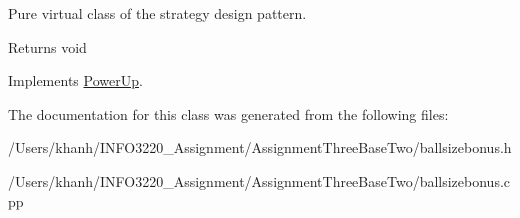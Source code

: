 Pure virtual class of the strategy design pattern. 

\begin{DoxyReturn}{Returns}
void 
\end{DoxyReturn}


Implements \hyperlink{class_power_up}{Power\+Up}.



The documentation for this class was generated from the following files\+:\begin{DoxyCompactItemize}
\item 
/\+Users/khanh/\+I\+N\+F\+O3220\+\_\+\+Assignment/\+Assignment\+Three\+Base\+Two/ballsizebonus.\+h\item 
/\+Users/khanh/\+I\+N\+F\+O3220\+\_\+\+Assignment/\+Assignment\+Three\+Base\+Two/ballsizebonus.\+cpp\end{DoxyCompactItemize}
